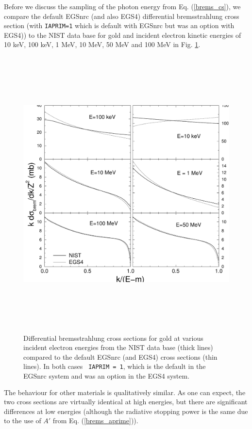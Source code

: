 Before we discuss the sampling of the photon energy from
Eq. (\ref{brems_cs}), we compare the default EGSnrc
(and also EGS4) differential bremsstrahlung cross section
(with {\tt IAPRIM=1} which is default with EGSnrc but was an option with
EGS4)) to the NIST data base for gold and
incident electron kinetic energies of 10 keV, 100 keV,
1 MeV, 10 MeV, 50 MeV and 100 MeV in Fig. \ref{brems_fig1}.
\begin{figure}[htp]
\includegraphics[height=15cm,width=15cm]{figures/brem79}
\caption[Bremsstrahlung cross sections]{\label{brems_fig1}
Differential bremsstrahlung cross sections
for gold at various incident electron energies from the NIST data base
\protect\cite{SB85,SB86a} (thick lines) compared to the
default EGSnrc (and EGS4) cross sections (thin lines). In both cases {\tt
IAPRIM = 1}, which is the default in the EGSnrc system and was an option
in the EGS4 system.}
 
\end{figure}
The behaviour for other materials is qualitatively similar.
As one can expect, the two cross sections are virtually
identical at high energies, but there are significant differences
at low energies (although the radiative stopping power is the
same due to the use of $A'$ from Eq. (\ref{brems_aprime})).

